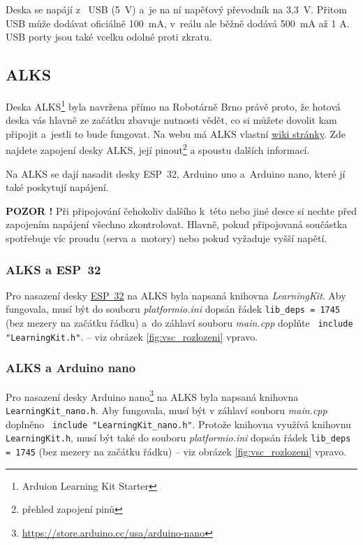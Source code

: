 Deska se napájí z~ USB (5~V) a~je na ní napěťový převodník
na 3,3~V. Přitom USB může dodávat oficiálně 100~mA, v~reálu ale běžně dodává 500~mA až 1 A. USB porty jsou také vcelku odolné proti zkratu.   

 \subsection{ALKS} \label{alks}  

Deska ALKS\footnote{Arduion Learning Kit Starter} byla navržena přímo na Robotárně Brno právě proto, že 
hotová deska   
vás hlavně ze začátku zbavuje nutnosti vědět, co si můžete dovolit kam připojit a~jestli to bude fungovat. 
Na webu má ALKS vlastní \href{https://github.com/RoboticsBrno/ArduinoLearningKitStarter/wiki}{wiki stránky}.
Zde najdete zapojení desky ALKS, její pinout\footnote{přehled zapojení pinů }  a spoustu dalších informací. 


Na ALKS se dají nasadit desky ESP~32, Arduino uno  a~Arduino nano, které jí také poskytují napájení.  

{\bf POZOR !} Při připojování čehokoliv dalšího k~této nebo jiné desce si nechte před zapojením napájení všechno zkontrolovat. Hlavně, pokud připojovaná součástka spotřebuje víc proudu (serva a~motory) nebo pokud vyžaduje vyšší napětí. 

\label{alks:knihovna} \subsubsection*{ALKS a ESP~32}

Pro nasazení desky   \hyperref[esp32]{ESP~32}
 na ALKS byla  napsaná knihovna {\it LearningKit}. 
Aby fungovala, musí být do souboru {\it platformio.ini} dopsán řádek 
{\tt lib\_deps = 1745} (bez mezery na začátku řádku) a~do záhlaví souboru {\it main.cpp} doplňte 
\verb| include "LearningKit.h"|.
 -- viz obrázek \ref{fig:vsc_rozlozeni} vpravo.

\label{alks:nano} \subsubsection*{ALKS a Arduino nano}

Pro nasazení desky Arduino nano\footnote{\url{https://store.arduino.cc/usa/arduino-nano}} 
na ALKS byla  napsaná knihovna \newline
{\tt LearningKit\_nano.h}. 
Aby fungovala, musí být v záhlaví souboru {\it main.cpp} doplněno
\verb| include "LearningKit_nano.h"|. Protože knihovna  využívá 
knihovnu {\tt LearningKit.h}, musí být také do souboru {\it platformio.ini} dopsán řádek {\tt lib\_deps = 1745} (bez mezery na začátku řádku)  -- viz obrázek \ref{fig:vsc_rozlozeni} vpravo.



